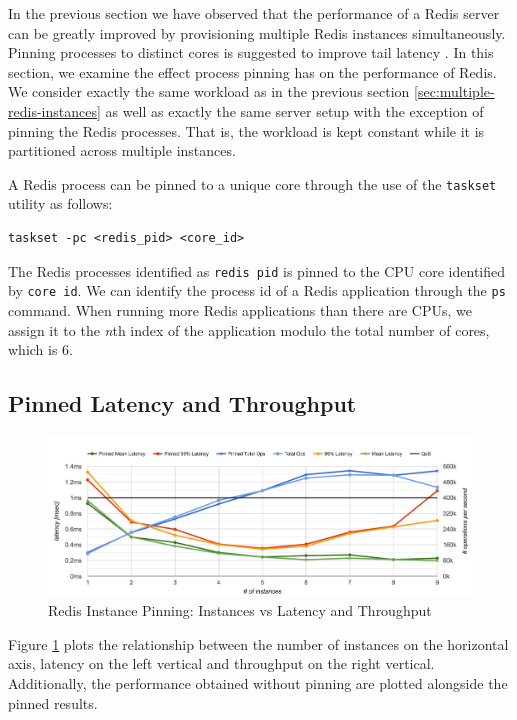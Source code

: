 In the previous section we have observed that the performance of a Redis server can be greatly improved by provisioning multiple Redis instances simultaneously. Pinning processes to distinct cores is suggested to improve tail latency \cite{leverich2014reconciling}. In this section, we examine the effect process pinning has on the performance of Redis. We consider exactly the same workload as in the previous section \ref{sec:multiple-redis-instances} as well as exactly the same server setup with the exception of pinning the Redis processes. That is, the workload is kept constant while it is partitioned across multiple instances.

A Redis process can be pinned to a unique core through the use of the \texttt{taskset} utility as follows:

\begin{lstlisting}
taskset -pc <redis_pid> <core_id>
\end{lstlisting}

The Redis processes identified as \texttt{redis pid} is pinned to the CPU core identified by \texttt{core id}. We can identify the process id of a Redis application through the \texttt{ps} command. When running more Redis applications than there are CPUs, we assign it to the \textit{n}th index of the application modulo the total number of cores, which is 6.


\subsection{Pinned Latency and Throughput}

\begin{figure}[h]
    \includegraphics[width=\textwidth]{./res/6_pinned.png}
    \caption{Redis Instance Pinning: Instances vs Latency and Throughput}
    \label{fig:6_pinned.png}
\end{figure}

Figure \ref{fig:6_pinned.png} plots the relationship between the number of instances on the horizontal axis, latency on the left vertical and throughput on the right vertical. Additionally, the performance obtained without pinning are plotted alongside the pinned results.

